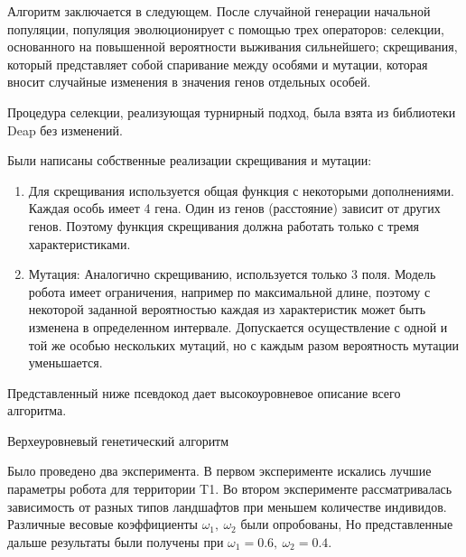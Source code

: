 Алгоритм заключается в следующем. После случайной генерации начальной популяции, популяция эволюционирует с помощью трех операторов: селекции, основанного на повышенной вероятности выживания сильнейшего; скрещивания, который представляет собой спаривание между особями и мутации, которая вносит случайные изменения в значения генов отдельных особей.

Процедура селекции, реализующая турнирный подход, была взята из библиотеки Deap без изменений. 

Были написаны собственные реализации скрещивания и мутации:
\begin{enumerate}
\item Для скрещивания используется общая функция с некоторыми дополнениями. Каждая особь имеет 4 гена. Один из генов (расстояние) зависит от других генов. Поэтому функция скрещивания должна работать только с  тремя характеристиками.

\item Мутация: Аналогично скрещиванию, используется только 3 поля. Модель робота имеет ограничения, например по максимальной длине, поэтому с некоторой заданной вероятностью каждая из характеристик может быть изменена в определенном интервале. Допускается осуществление с одной и той же особью нескольких мутаций, но с каждым разом вероятность мутации уменьшается. 
\end{enumerate}

Представленный ниже псевдокод дает высокоуровневое описание всего алгоритма.

\begin{algorithm}[H]
\caption{Верхеуровневый генетический алгоритм\label{high_level}}
\end{algorithm}

Было проведено два эксперимента. В первом эксперименте искались лучшие параметры робота для территории T1. Во втором эксперименте рассматривалась зависимость от разных типов ландшафтов при меньшем количестве индивидов. Различные весовые коэффициенты $\omega_1,\ \omega_2$ были опробованы, Но представленные дальше результаты были получены при $\omega_1 = 0.6,\ \omega_2 = 0.4$. 



